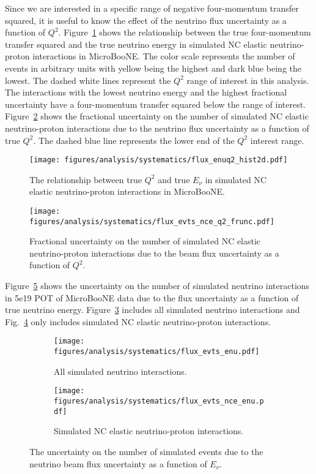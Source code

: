     Since we are interested in a specific range of negative four-momentum
    transfer squared, it is useful to know the effect of the neutrino flux
    uncertainty as a function of $Q^2$. Figure~\ref{fig:qevenu} shows the
    relationship between the true four-momentum transfer squared and the true
    neutrino energy in simulated NC elastic neutrino-proton interactions in
    MicroBooNE. The color scale represents the number of events in arbitrary
    units with yellow being the highest and dark blue being the lowest. The
    dashed white lines represent the $Q^2$ range of interest in this analysis.
    The interactions with the lowest neutrino energy and the highest fractional
    uncertainty have a four-momentum transfer squared below the range of
    interest. Figure~\ref{fig:q2frac} shows the fractional uncertainty on the
    number of simulated NC elastic neutrino-proton interactions due to the
    neutrino flux uncertainty as a function of true $Q^2$. The dashed blue line
    represents the lower end of the $Q^2$ interest range.
    \begin{figure}[ht]
      \centering
      \texttt{[image: figures/analysis/systematics/flux\_enuq2\_hist2d.pdf]}
      \caption{The relationship between true $Q^2$ and true $E_{\nu}$ in
      simulated NC elastic neutrino-proton interactions in MicroBooNE.}
      \label{fig:qevenu}
    \end{figure}
    \begin{figure}[ht]
      \centering
      \texttt{[image: figures/analysis/systematics/flux\_evts\_nce\_q2\_frunc.pdf]}
      \caption{Fractional uncertainty on the number of simulated NC elastic
      neutrino-proton interactions due to the beam flux uncertainty as a
      function of $Q^2$.}
      \label{fig:q2frac}
    \end{figure}
    Figure~\ref{fig:fluxq2} shows the uncertainty on the number of simulated
    neutrino interactions in 5e19 POT of MicroBooNE data due to the flux
    uncertainty as a function of true neutrino energy.
    Figure~\ref{fig:fluxq2all} includes all simulated neutrino interactions and
    Fig.~\ref{fig:fluxq2nce} only includes simulated NC elastic neutrino-proton
    interactions.
    \begin{figure}[h]
      \centering
      \begin{subfigure}[t]{2.8in}
        \texttt{[image: figures/analysis/systematics/flux\_evts\_enu.pdf]}
        \caption{All simulated neutrino interactions.}
        \label{fig:fluxq2all}
      \end{subfigure}
      \hspace{2pt}
      \begin{subfigure}[t]{2.8in}
        \texttt{[image: figures/analysis/systematics/flux\_evts\_nce\_enu.pdf]}
        \caption{Simulated NC elastic neutrino-proton interactions.}
        \label{fig:fluxq2nce}
      \end{subfigure}
      \caption{The uncertainty on the number of simulated events due to the
      neutrino beam flux uncertainty as a function of $E_{\nu}$.}
      \label{fig:fluxq2}
    \end{figure}

